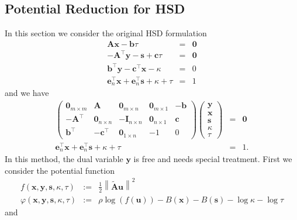 \documentclass{article}
\newcommand{\assign}{:=}
\newcommand{\x}{\mathbf{x}}
\newcommand{\A}{\mathbf{A}}
\newcommand{\0}{\textbf{0}}
\newcommand{\e}{\mathbf{e}}
\newcommand{\I}{\mathbf{I}}
\newcommand{\tmb}{\mathbf{b}}
\newcommand{\tmc}{\mathbf{c}}
\newcommand{\y}{\mathbf{y}}
\newcommand{\s}{\mathbf{s}}
\newcommand{\tmu}{\mathbf{u}}
\begin{document}
\subsection{Potential Reduction for HSD}

In this section we consider the original HSD formulation
\begin{eqnarray*}
  \A \x - \tmb \tau & = & \0\\
  - \A^{\top} \y - \s + \tmc \tau & = & \0\\
  \tmb^{\top} \y - \tmc^{\top} \x - \kappa & = & 0\\
  \e_n^{\top} \x + \e_n^{\top} \s + \kappa + \tau & = & 1
\end{eqnarray*}
and we have
\begin{eqnarray*}
  \left(\begin{array}{ccccc}
    \0_{m \times m} & \A & \0_{m \times n} & \0_{m \times 1} & - \tmb\\
    - \A^{\top} & \0_{n \times n} & - \I_{n \times n} & \0_{n \times 1} &
    \tmc\\
    \tmb^{\top} & - \tmc^{\top} & \0_{1 \times n} & - 1 & 0
  \end{array}\right) \left(\begin{array}{c}
    \y\\
    \x\\
    \s\\
    \kappa\\
    \tau
  \end{array}\right) & = & \0\\
  \e_n^{\top} \x + \e_n^{\top} \s + \kappa + \tau & = & 1.
\end{eqnarray*}
In this method, the dual variable $\y$ is free and needs special treatment.
First we consider the potential function
\begin{eqnarray*}
  f \left( \x, \y, \s, \kappa, \tau \right) & \assign & \frac{1}{2} \left\|
  \widetilde{\A} \tmu \right\|^2\\
  \varphi \left( \x, \y, \s, \kappa, \tau \right) & \assign & \rho \log \left(
  f \left( \tmu \right) \right) - B \left( \x \right) - B \left( \s \right) -
  \log \kappa - \log \tau
\end{eqnarray*}
and
\end{document}
